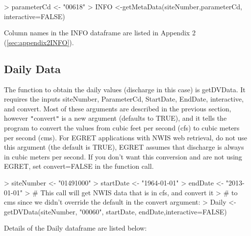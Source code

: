 \documentclass[a4paper,11pt]{article}
\begin{document}
\begin{Schunk}
\begin{Sinput}
> parameterCd <- "00618"
> INFO <-getMetaData(siteNumber,parameterCd, interactive=FALSE)
\end{Sinput}
\end{Schunk}

Column names in the INFO dataframe are listed in Appendix 2 (\ref{sec:appendix2INFO}).

\FloatBarrier
\subsection{Daily Data}
The function to obtain the daily values (discharge in this case) is getDVData.  It requires the inputs siteNumber, ParameterCd, StartDate, EndDate, interactive, and convert. Most of these arguments are described in the previous section, however \texttt{"}convert\texttt{"} is a new argument (defaults to TRUE), and it tells the program to convert the values from cubic feet per second (cfs) to cubic meters per second (cms). For EGRET applications with NWIS web retrieval, do not use this argument (the default is TRUE), EGRET assumes that discharge is always in cubic meters per second. If you don't want this conversion and are not using EGRET, set convert=FALSE in the function call. 

\begin{Schunk}
\begin{Sinput}
> siteNumber <- "01491000"
> startDate <- "1964-01-01"
> endDate <- "2013-01-01"
> # This call will get NWIS data that is in cfs, and convert it
> # to cms since we didn't override the default in the convert argument:
> Daily <- getDVData(siteNumber, "00060", startDate, endDate,interactive=FALSE)
\end{Sinput}
\end{Schunk}

Details of the Daily dataframe are listed below:
\end{document}
